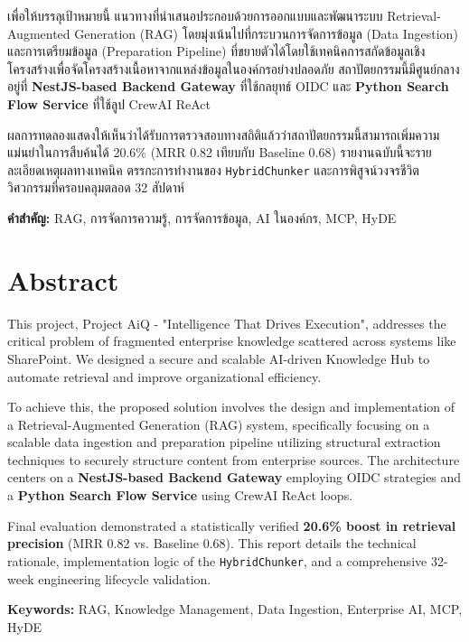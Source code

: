 \documentclass[12pt]{article}
\begin{document}
เพื่อให้บรรลุเป้าหมายนี้ แนวทางที่นำเสนอประกอบด้วยการออกแบบและพัฒนาระบบ Retrieval-Augmented Generation (RAG) โดยมุ่งเน้นไปที่กระบวนการจัดการข้อมูล (Data Ingestion) และการเตรียมข้อมูล (Preparation Pipeline) ที่ขยายตัวได้โดยใช้เทคนิคการสกัดข้อมูลเชิงโครงสร้างเพื่อจัดโครงสร้างเนื้อหาจากแหล่งข้อมูลในองค์กรอย่างปลอดภัย สถาปัตยกรรมนี้มีศูนย์กลางอยู่ที่ \textbf{NestJS-based Backend Gateway} ที่ใช้กลยุทธ์ OIDC และ \textbf{Python Search Flow Service} ที่ใช้ลูป CrewAI ReAct

ผลการทดลองแสดงให้เห็นว่าได้รับการตรวจสอบทางสถิติแล้วว่าสถาปัตยกรรมนี้สามารถเพิ่มความแม่นยำในการสืบค้นได้ 20.6\% (MRR 0.82 เทียบกับ Baseline 0.68) รายงานฉบับนี้จะรายละเอียดเหตุผลทางเทคนิค ตรรกะการทำงานของ \texttt{HybridChunker} และการพิสูจน์วงจรชีวิตวิศวกรรมที่ครอบคลุมตลอด 32 สัปดาห์

\textbf{คำสำคัญ:} RAG, การจัดการความรู้, การจัดการข้อมูล, AI ในองค์กร, MCP, HyDE

\newpage

\section*{Abstract}
This project, Project AiQ - "Intelligence That Drives Execution", addresses the critical problem of fragmented enterprise knowledge scattered across systems like SharePoint. We designed a secure and scalable AI-driven Knowledge Hub to automate retrieval and improve organizational efficiency. 

To achieve this, the proposed solution involves the design and implementation of a Retrieval-Augmented Generation (RAG) system, specifically focusing on a scalable data ingestion and preparation pipeline utilizing structural extraction techniques to securely structure content from enterprise sources. The architecture centers on a \textbf{NestJS-based Backend Gateway} employing OIDC strategies and a \textbf{Python Search Flow Service} using CrewAI ReAct loops. 

Final evaluation demonstrated a statistically verified \textbf{20.6\% boost in retrieval precision} (MRR 0.82 vs. Baseline 0.68). This report details the technical rationale, implementation logic of the \texttt{HybridChunker}, and a comprehensive 32-week engineering lifecycle validation.

\textbf{Keywords:} RAG, Knowledge Management, Data Ingestion, Enterprise AI, MCP, HyDE

\newpage
\end{document}
